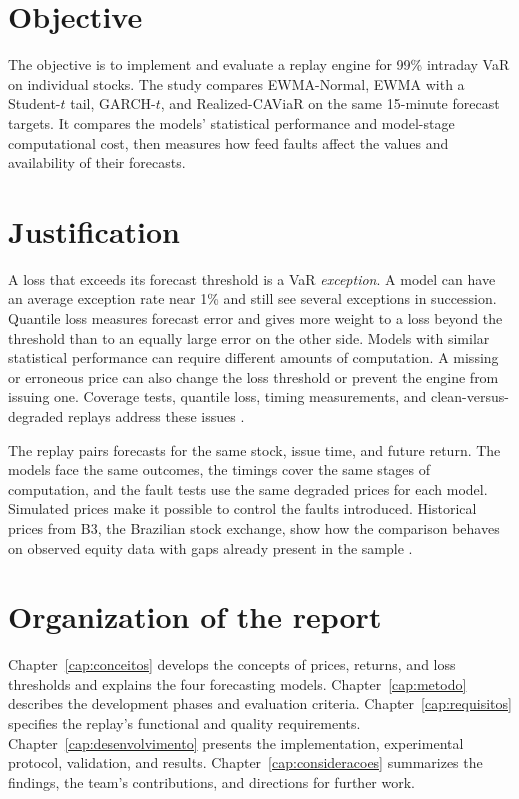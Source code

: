 \documentclass[
	12pt,				%
	openright,			%
	twoside,			%
	a4paper,
	chapter=TITLE,
	english				%
	]{abntex2}
\begin{document}
\section{Objective}

The objective is to implement and evaluate a replay engine for 99\% intraday VaR on individual stocks. The study compares EWMA-Normal, EWMA with a Student-$t$ tail, GARCH-$t$, and Realized-CAViaR on the same 15-minute forecast targets. It compares the models' statistical performance and model-stage computational cost, then measures how feed faults affect the values and availability of their forecasts.

\section{Justification}

A loss that exceeds its forecast threshold is a VaR \emph{exception}. A model can have an average exception rate near 1\% and still see several exceptions in succession. Quantile loss measures forecast error and gives more weight to a loss beyond the threshold than to an equally large error on the other side. Models with similar statistical performance can require different amounts of computation. A missing or erroneous price can also change the loss threshold or prevent the engine from issuing one. Coverage tests, quantile loss, timing measurements, and clean-versus-degraded replays address these issues \cite{kupiec-1995,christoffersen-1998,diebold-mariano-1995,project-atam}.

The replay pairs forecasts for the same stock, issue time, and future return. The models face the same outcomes, the timings cover the same stages of computation, and the fault tests use the same degraded prices for each model. Simulated prices make it possible to control the faults introduced. Historical prices from B3, the Brazilian stock exchange, show how the comparison behaves on observed equity data with gaps already present in the sample \cite{project-data,project-comparison}.

\section{Organization of the report}

Chapter~\ref{cap:conceitos} develops the concepts of prices, returns, and loss thresholds and explains the four forecasting models. Chapter~\ref{cap:metodo} describes the development phases and evaluation criteria. Chapter~\ref{cap:requisitos} specifies the replay's functional and quality requirements. Chapter~\ref{cap:desenvolvimento} presents the implementation, experimental protocol, validation, and results. Chapter~\ref{cap:consideracoes} summarizes the findings, the team's contributions, and directions for further work.
\end{document}
